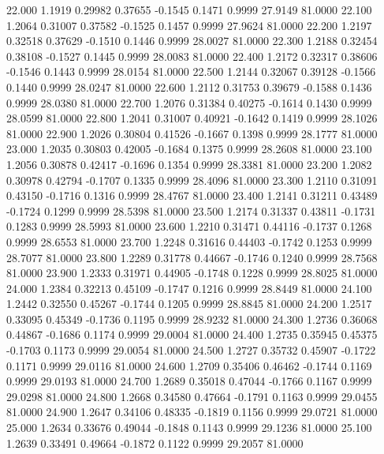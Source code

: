   22.000   1.1919   0.29982   0.37655  -0.1545   0.1471   0.9999  27.9149  81.0000
  22.100   1.2064   0.31007   0.37582  -0.1525   0.1457   0.9999  27.9624  81.0000
  22.200   1.2197   0.32518   0.37629  -0.1510   0.1446   0.9999  28.0027  81.0000
  22.300   1.2188   0.32454   0.38108  -0.1527   0.1445   0.9999  28.0083  81.0000
  22.400   1.2172   0.32317   0.38606  -0.1546   0.1443   0.9999  28.0154  81.0000
  22.500   1.2144   0.32067   0.39128  -0.1566   0.1440   0.9999  28.0247  81.0000
  22.600   1.2112   0.31753   0.39679  -0.1588   0.1436   0.9999  28.0380  81.0000
  22.700   1.2076   0.31384   0.40275  -0.1614   0.1430   0.9999  28.0599  81.0000
  22.800   1.2041   0.31007   0.40921  -0.1642   0.1419   0.9999  28.1026  81.0000
  22.900   1.2026   0.30804   0.41526  -0.1667   0.1398   0.9999  28.1777  81.0000
  23.000   1.2035   0.30803   0.42005  -0.1684   0.1375   0.9999  28.2608  81.0000
  23.100   1.2056   0.30878   0.42417  -0.1696   0.1354   0.9999  28.3381  81.0000
  23.200   1.2082   0.30978   0.42794  -0.1707   0.1335   0.9999  28.4096  81.0000
  23.300   1.2110   0.31091   0.43150  -0.1716   0.1316   0.9999  28.4767  81.0000
  23.400   1.2141   0.31211   0.43489  -0.1724   0.1299   0.9999  28.5398  81.0000
  23.500   1.2174   0.31337   0.43811  -0.1731   0.1283   0.9999  28.5993  81.0000
  23.600   1.2210   0.31471   0.44116  -0.1737   0.1268   0.9999  28.6553  81.0000
  23.700   1.2248   0.31616   0.44403  -0.1742   0.1253   0.9999  28.7077  81.0000
  23.800   1.2289   0.31778   0.44667  -0.1746   0.1240   0.9999  28.7568  81.0000
  23.900   1.2333   0.31971   0.44905  -0.1748   0.1228   0.9999  28.8025  81.0000
  24.000   1.2384   0.32213   0.45109  -0.1747   0.1216   0.9999  28.8449  81.0000
  24.100   1.2442   0.32550   0.45267  -0.1744   0.1205   0.9999  28.8845  81.0000
  24.200   1.2517   0.33095   0.45349  -0.1736   0.1195   0.9999  28.9232  81.0000
  24.300   1.2736   0.36068   0.44867  -0.1686   0.1174   0.9999  29.0004  81.0000
  24.400   1.2735   0.35945   0.45375  -0.1703   0.1173   0.9999  29.0054  81.0000
  24.500   1.2727   0.35732   0.45907  -0.1722   0.1171   0.9999  29.0116  81.0000
  24.600   1.2709   0.35406   0.46462  -0.1744   0.1169   0.9999  29.0193  81.0000
  24.700   1.2689   0.35018   0.47044  -0.1766   0.1167   0.9999  29.0298  81.0000
  24.800   1.2668   0.34580   0.47664  -0.1791   0.1163   0.9999  29.0455  81.0000
  24.900   1.2647   0.34106   0.48335  -0.1819   0.1156   0.9999  29.0721  81.0000
  25.000   1.2634   0.33676   0.49044  -0.1848   0.1143   0.9999  29.1236  81.0000
  25.100   1.2639   0.33491   0.49664  -0.1872   0.1122   0.9999  29.2057  81.0000
